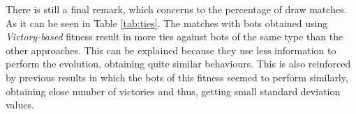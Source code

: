 \documentclass[preprint]{elsarticle}
\begin{document}
There is still a final remark, which concerns to the percentage of draw matches.
As it can be seen in Table \ref{tab:ties}. The matches with bots obtained using \textit{Victory-based}
fitness  result in more ties against bots of the same type than the
other approaches. %
This can be explained because they use less
information to perform the evolution, obtaining quite similar
behaviours. %
This is also reinforced by previous results in which the
bots of this fitness seemed to perform similarly, obtaining close
number of victories and thus, getting small standard deviation
values. 





\end{document}
